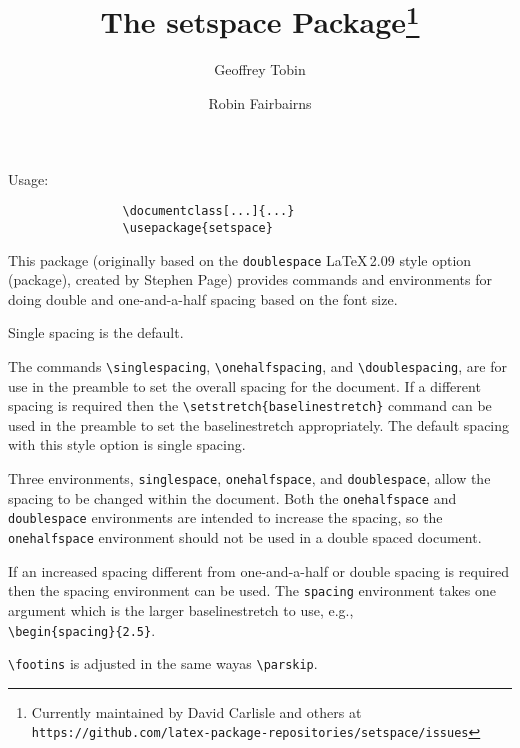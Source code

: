 \documentclass[a4paper]{article}
\title{The setspace Package\thanks{Currently maintained by David Carlisle and others at\\\texttt{https://github.com/latex-package-repositories/setspace/issues}}}
\date{\filedate}
\author{Geoffrey Tobin\and Robin Fairbairns}
\begin{document}
\maketitle

 Usage:

\begin{verbatim}
                \documentclass[...]{...}
                \usepackage{setspace}
\end{verbatim}


         This package (originally based on the \texttt{doublespace} \LaTeX\,2.09 style
         option (package),  created by Stephen Page)
         provides commands and environments for doing double and
         one-and-a-half spacing based on the font size.

         Single spacing is the default.

         The commands \verb|\singlespacing|, \verb|\onehalfspacing|, and
         \verb|\doublespacing|, are for use in the preamble to set the overall
         spacing for the document.  If a different spacing is required then
         the \verb|\setstretch{baselinestretch}| command can be used in the
         preamble to set the baselinestretch appropriately.  The default
         spacing with this style option is single spacing.

         Three environments, \verb|singlespace|, \verb|onehalfspace|,
         and \verb|doublespace|, allow the spacing to be changed
         within the document.  Both the \verb|onehalfspace| and
         \verb|doublespace| environments are intended to increase the
         spacing, so the \verb|onehalfspace| environment should not be
         used in a double spaced document.

         If an increased spacing different from one-and-a-half or
         double spacing is required then the spacing environment can
         be used.  The \verb|spacing| environment takes one argument
         which is the larger baselinestretch to use, e.g.,\\
         \verb|\begin{spacing}{2.5}|.

         \verb|\footins| is adjusted in the same wayas \verb|\parskip|.


\clearpage
\addtolength\textwidth{100pt}
\addtolength\oddsidemargin{-70pt}
\setlength\columnseprule{1pt}
\setlength\columnsep{10pt}
\twocolumn
\tiny

\end{document}
